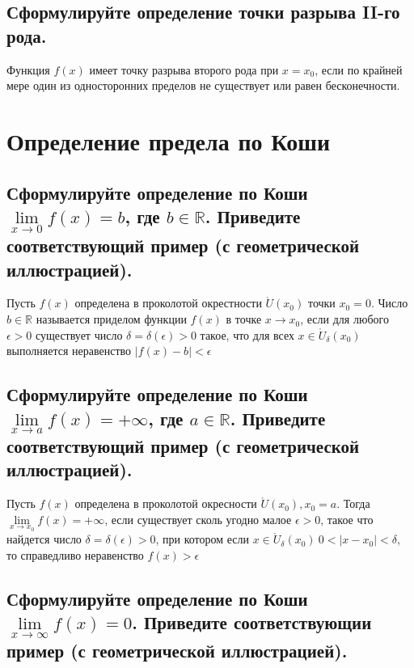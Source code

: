     \subsection{Сформулируйте определение точки разрыва II-го рода.}
    
    Функция $f(x)$ имеет точку разрыва второго рода при $x=x_0$, если по крайней мере один 
    из односторонних пределов не существует или равен бесконечности.

\newpage
\section{Определение предела по Коши}
    \subsection{Сформулируйте определение по Коши $\lim\limits_{x \to 0} f (x) = b$, где $b \in \mathbb{R}$. Приведите 
    соответствующий пример (с геометрической иллюстрацией).}

    Пусть $f(x)$ определена в проколотой окрестности $\mathring U(x_0)$ точки $x_0 = 0$. Число $b \in \mathbb{R}$ 
    называется приделом функции $f(x)$ в точке $x \to x_0$, если для любого $\epsilon > 0$ существует число 
    $\delta = \delta(\epsilon) > 0$ такое, что  для всех $x \in \mathring U_\delta(x_0)$ выполняется неравенство 
    $|f(x) - b| < \epsilon$

    \subsection{Сформулируйте определение по Коши $\lim\limits_{x \to a} f (x) = +\infty$, где $a \in \mathbb{R}$. Приведите 
    соответствующий пример (с геометрической иллюстрацией).}

    Пусть $f(x)$ определена в проколотой окресности $\mathring U(x_0), x_0 = a$. Тогда 
    $\lim\limits_{x \to x_0} f(x) = +\infty$, если существует сколь угодно малое $\epsilon > 0$, 
    такое что найдется число $\delta = \delta(\epsilon) > 0$, при котором если $x \in \mathring U_\delta(x_0) \ 
    0 < |x - x_0| < \delta$, то справедливо неравенство $f(x) > \epsilon$ 
    \image{2.png}{200}

    \subsection{Сформулируйте определение по Коши $\lim\limits_{x \to \infty} f (x) = 0$. Приведите соответствующии 
    пример (с геометрической иллюстрацией).}

